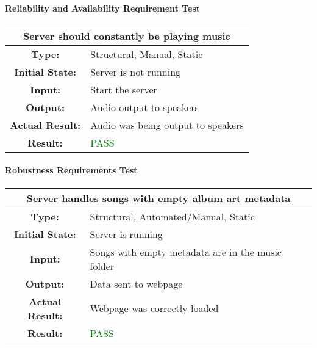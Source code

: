 \documentclass[12pt, titlepage]{article}
\begin{document}
\paragraph{Reliability and Availability Requirement Test}

\begin{center}
\begin{table}[H]
\begin{tabularx}{\textwidth}{| c X |}
\hline
\multicolumn{2}{|c|}{\textbf{Server should constantly be playing music}}\\
\hline
\textbf{Type: } & Structural, Manual, Static\\
\textbf{Initial State: } & Server is not running\\
\textbf{Input: } & Start the server\\
\textbf{Output: } & Audio output to speakers \\
\textbf{Actual Result:  } & Audio was being output to speakers \\
\textbf{Result: } & \textcolor{green}{PASS}\\
\hline
\end{tabularx}
\end{table}
\end{center}

\paragraph{Robustness Requirements Test}

\begin{center}
\begin{table}[H]
\begin{tabularx}{\textwidth}{| c X |}
\hline
\multicolumn{2}{|c|}{\textbf{Server handles songs with empty album art metadata}}\\
\hline
\textbf{Type: } & Structural, Automated/Manual, Static\\
\textbf{Initial State: } & Server is running\\
\textbf{Input: } & Songs with empty metadata are in the music folder\\
\textbf{Output: } & Data sent to webpage \\
\textbf{Actual Result:  } & Webpage was correctly loaded \\
\textbf{Result: } & \textcolor{green}{PASS}\\
\hline
\end{tabularx}
\end{table}
\end{center}
\end{document}
